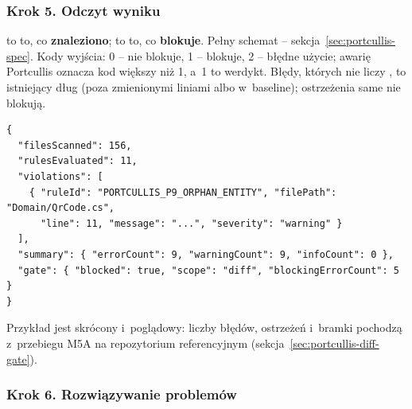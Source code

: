 \subsubsection{Krok 5. Odczyt wyniku}

 to to, co \textbf{znaleziono};
 to to, co \textbf{blokuje}. Pełny schemat --
sekcja~\ref{sec:portcullis-spec}. Kody wyjścia: 0 -- nie blokuje, 1 -- blokuje, 2 -- błędne
użycie; awarię Portcullis oznacza kod większy niż 1, a~1 to werdykt. Błędy, których nie liczy
, to istniejący dług (poza zmienionymi liniami albo w~baseline);
ostrzeżenia same nie blokują.

\begin{lstlisting}
{
  "filesScanned": 156,
  "rulesEvaluated": 11,
  "violations": [
    { "ruleId": "PORTCULLIS_P9_ORPHAN_ENTITY", "filePath": "Domain/QrCode.cs",
      "line": 11, "message": "...", "severity": "warning" }
  ],
  "summary": { "errorCount": 9, "warningCount": 9, "infoCount": 0 },
  "gate": { "blocked": true, "scope": "diff", "blockingErrorCount": 5 }
}
\end{lstlisting}
Przykład jest skrócony i~poglądowy: liczby błędów, ostrzeżeń i~bramki pochodzą z~przebiegu M5A
na repozytorium referencyjnym (sekcja~\ref{sec:portcullis-diff-gate}).

\subsubsection{Krok 6. Rozwiązywanie problemów}

